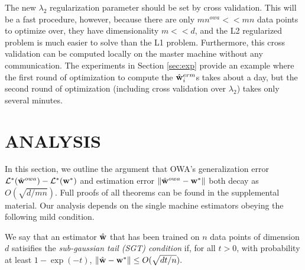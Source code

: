 \documentclass[thesis.tex]{subfiles}
\newcommand{\nowa}{n^{\textit{owa}}}
\begin{document}
\vspace{-0.05in}
The new $\lambda_2$ regularization parameter should be set by cross validation.
This will be a fast procedure, however, because there are only $m\nowa <\!\!< mn$ data points to optimize over,
they have dimensionality $m<\!\!<d$,
and the L2 regularized problem is much easier to solve than the L1 problem.
Furthermore, this cross validation can be computed locally on the master machine without any communication.
The experiments in Section \ref{sec:exp} provide an example where the first round of optimization to compute the $\hat{\mathbf w}^{erm}_i$s takes about a day, but the second round of optimization (including cross validation over $\lambda_2$) takes only several minutes.


\section{ANALYSIS}
\label{sec:anal}

In this section, we outline the argument that OWA's generalization error $\mathcal{L}^*(\hat{\mathbf w}^{owa})-\mathcal{L}^*({\mathbf w^{*}})$ and estimation error ${\lVert {\hat{\mathbf w}^{owa}-{\mathbf w^{*}}} \rVert}$ both decay as $O(\sqrt{d/mn})$.
Full proofs of all theorems can be found in the supplemental material.
%
Our analysis depends on the single machine estimators obeying the following mild condition.

\begin{definition}
We say that an estimator ${\hat{\mathbf w}}$ that has been trained on $n$ data points of dimension $d$ satisifies the \emph{sub-gaussian tail (SGT) condition} if,
for all $t>0$,
with probability at least $1-\exp(-t)$,
${\lVert {{\hat{\mathbf w}}-{\mathbf w^{*}}} \rVert} \le O( \sqrt{dt/n} ).$
\end{definition}
\end{document}
